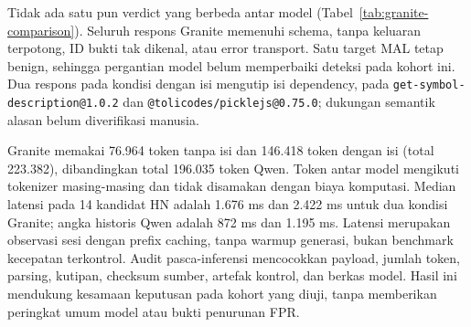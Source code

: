 Tidak ada satu pun verdict yang berbeda antar model
(Tabel~\ref{tab:granite-comparison}). Seluruh respons Granite memenuhi
schema, tanpa keluaran terpotong, ID bukti tak dikenal, atau error transport.
Satu target MAL tetap benign, sehingga pergantian model belum memperbaiki
deteksi pada kohort ini. Dua respons pada kondisi dengan isi mengutip isi
dependency, pada \texttt{get-symbol-description@1.0.2} dan
\texttt{@tolicodes/picklejs@0.75.0}; dukungan semantik alasan belum
diverifikasi manusia.

Granite memakai 76.964 token tanpa isi dan 146.418 token dengan isi (total
223.382), dibandingkan total 196.035 token Qwen. Token antar model mengikuti
tokenizer masing-masing dan tidak disamakan dengan biaya komputasi. Median
latensi pada 14 kandidat HN adalah 1.676 ms dan 2.422 ms untuk dua kondisi
Granite; angka historis Qwen adalah 872 ms dan 1.195 ms. Latensi merupakan
observasi sesi dengan prefix caching, tanpa warmup generasi, bukan benchmark
kecepatan terkontrol. Audit pasca-inferensi mencocokkan payload, jumlah token,
parsing, kutipan, checksum sumber, artefak kontrol, dan berkas model. Hasil
ini mendukung kesamaan keputusan pada kohort yang diuji, tanpa memberikan
peringkat umum model atau bukti penurunan FPR.
